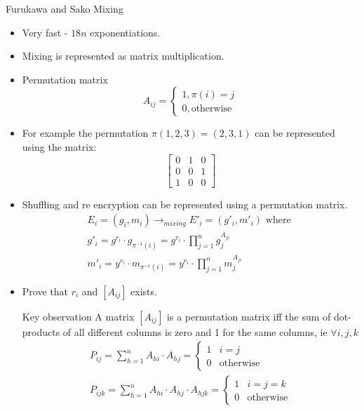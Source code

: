 \documentclass{beamer}
\begin{document}
\begin{frame}[allowframebreaks]{Furukawa and Sako Mixing \cite{FS01}}
\begin{itemize}
\item Very fast - $18n$ exponentiations.
\item Mixing is represented as matrix multiplication.
\item Permutation matrix
\[
A_{ij} = \begin{cases} 1, \pi(i)=j \\ 0, \text{otherwise} \end{cases}
\]
\item For example the permutation $\pi(1,2,3) = (2,3,1)$ can be represented using the matrix:
\[\begin{bmatrix}
  0 & 1 & 0 \\
  0 & 0 & 1 \\
  1 & 0 & 0
 \end{bmatrix}\]
\item Shuffling and re encryption can be represented using a permutation matrix.
\begin{align*}
E_i = (g_i,m_i) \rightarrow_{mixing} E'_i = (g'_i,m'_i) \text{ where } \\
g'_i = g^{r_i} \cdot g_{\pi^{-1}(i)} = g^{r_i} \cdot \prod_{j=1}^{n} g_j ^ {A_{ji}} \\
m'_i = y^{r_i} \cdot m_{\pi^{-1}(i)} = y^{r_i} \cdot \prod_{j=1}^{n} m_j ^ {A_{ji}}
\end{align*}
\item Prove that $r_i$ and $[A_{ij}]$ exists.

\begin{block} {Key observation}
A matrix $[A_{ij}]$ is a permutation matrix iff the sum of dot-products of all different columns is zero and 1 for the same columns, ie $\forall i,j,k$ 
\begin{align*}
P_{ij} = \sum_{h=1}^{n} A_{hi} \cdot A_{hj} = \begin{cases} 1 & i=j \\ 0 & \text{otherwise} \end{cases} \\
P_{ijk} = \sum_{h=1}^{n} A_{hi} \cdot A_{hj} \cdot A_{hjk}   = \begin{cases} 1 & i=j=k \\ 0 & \text{otherwise} \end{cases}
\end{align*}
\end{block}


\end{itemize}
\end{frame}
\end{document}
